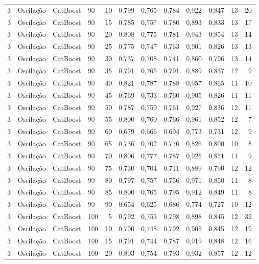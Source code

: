 \begin{longtable}{ccclrrrrrrrr}
3 & Oscilação & CatBoost & 90 & 10 & 0,799 & 0,765 & 0,784 & 0,922 & 0,847 & 13 & 20 \\
3 & Oscilação & CatBoost & 90 & 15 & 0,785 & 0,757 & 0,780 & 0,893 & 0,833 & 13 & 17 \\
3 & Oscilação & CatBoost & 90 & 20 & 0,808 & 0,775 & 0,781 & 0,943 & 0,854 & 13 & 14 \\
3 & Oscilação & CatBoost & 90 & 25 & 0,775 & 0,747 & 0,763 & 0,901 & 0,826 & 13 & 13 \\
3 & Oscilação & CatBoost & 90 & 30 & 0,737 & 0,708 & 0,741 & 0,860 & 0,796 & 13 & 14 \\
3 & Oscilação & CatBoost & 90 & 35 & 0,791 & 0,765 & 0,791 & 0,889 & 0,837 & 12 & 9 \\
3 & Oscilação & CatBoost & 90 & 40 & 0,821 & 0,787 & 0,788 & 0,957 & 0,865 & 11 & 10 \\
3 & Oscilação & CatBoost & 90 & 45 & 0,769 & 0,733 & 0,760 & 0,905 & 0,826 & 11 & 11 \\
3 & Oscilação & CatBoost & 90 & 50 & 0,787 & 0,759 & 0,761 & 0,927 & 0,836 & 12 & 11 \\
3 & Oscilação & CatBoost & 90 & 55 & 0,800 & 0,760 & 0,766 & 0,961 & 0,852 & 12 & 7 \\
3 & Oscilação & CatBoost & 90 & 60 & 0,679 & 0,666 & 0,694 & 0,773 & 0,731 & 12 & 9 \\
3 & Oscilação & CatBoost & 90 & 65 & 0,736 & 0,702 & 0,776 & 0,826 & 0,800 & 10 & 8 \\
3 & Oscilação & CatBoost & 90 & 70 & 0,806 & 0,777 & 0,787 & 0,925 & 0,851 & 11 & 9 \\
3 & Oscilação & CatBoost & 90 & 75 & 0,730 & 0,704 & 0,711 & 0,889 & 0,790 & 12 & 12 \\
3 & Oscilação & CatBoost & 90 & 80 & 0,797 & 0,757 & 0,756 & 0,971 & 0,850 & 11 & 8 \\
3 & Oscilação & CatBoost & 90 & 85 & 0,800 & 0,765 & 0,795 & 0,912 & 0,849 & 11 & 8 \\
3 & Oscilação & CatBoost & 90 & 90 & 0,654 & 0,625 & 0,686 & 0,774 & 0,727 & 10 & 12 \\
3 & Oscilação & CatBoost & 100 & 5 & 0,792 & 0,753 & 0,798 & 0,898 & 0,845 & 12 & 32 \\
3 & Oscilação & CatBoost & 100 & 10 & 0,790 & 0,748 & 0,792 & 0,905 & 0,845 & 12 & 19 \\
3 & Oscilação & CatBoost & 100 & 15 & 0,791 & 0,744 & 0,787 & 0,919 & 0,848 & 12 & 16 \\
3 & Oscilação & CatBoost & 100 & 20 & 0,803 & 0,754 & 0,793 & 0,932 & 0,857 & 12 & 12 \\

\end{longtable}
